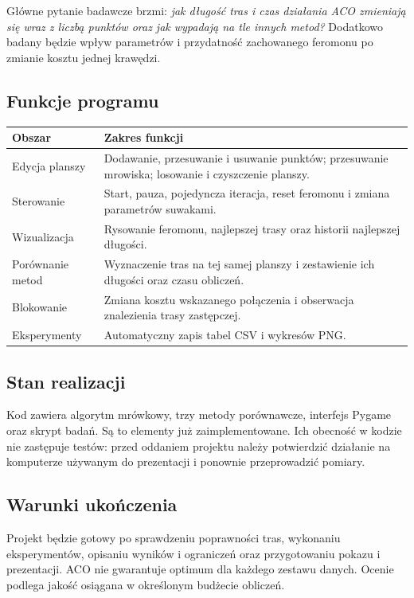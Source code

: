 \documentclass[11pt,a4paper]{article}
\begin{document}
Główne pytanie badawcze brzmi: \emph{jak długość tras i czas działania ACO zmieniają się wraz z liczbą punktów oraz jak wypadają na tle innych metod?} Dodatkowo badany będzie wpływ parametrów i przydatność zachowanego feromonu po zmianie kosztu jednej krawędzi.

\subsection{Funkcje programu}
\begin{tabularx}{\textwidth}{@{}p{3.3cm}Y@{}}
\toprule
\textbf{Obszar} & \textbf{Zakres funkcji} \\
\midrule
Edycja planszy & Dodawanie, przesuwanie i usuwanie punktów; przesuwanie mrowiska; losowanie i czyszczenie planszy. \\
Sterowanie & Start, pauza, pojedyncza iteracja, reset feromonu i zmiana parametrów suwakami. \\
Wizualizacja & Rysowanie feromonu, najlepszej trasy oraz historii najlepszej długości. \\
Porównanie metod & Wyznaczenie tras na tej samej planszy i zestawienie ich długości oraz czasu obliczeń. \\
Blokowanie & Zmiana kosztu wskazanego połączenia i obserwacja znalezienia trasy zastępczej. \\
Eksperymenty & Automatyczny zapis tabel CSV i wykresów PNG. \\
\bottomrule
\end{tabularx}

\subsection{Stan realizacji}
Kod zawiera algorytm mrówkowy, trzy metody porównawcze, interfejs Pygame oraz skrypt badań. Są to elementy już zaimplementowane. Ich obecność w kodzie nie zastępuje testów: przed oddaniem projektu należy potwierdzić działanie na komputerze używanym do prezentacji i ponownie przeprowadzić pomiary.

\subsection{Warunki ukończenia}
Projekt będzie gotowy po sprawdzeniu poprawności tras, wykonaniu eksperymentów, opisaniu wyników i ograniczeń oraz przygotowaniu pokazu i prezentacji. ACO nie gwarantuje optimum dla każdego zestawu danych. Ocenie podlega jakość osiągana w określonym budżecie obliczeń.
\end{document}
